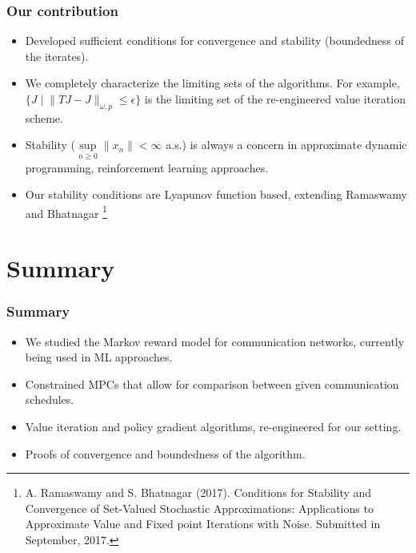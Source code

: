 \documentclass{beamer}
\begin{document}
\begin{frame}
 \frametitle{Our contribution}
 \begin{itemize}
\item Developed sufficient conditions for convergence and stability (boundedness of the iterates). 
  \item We completely characterize the limiting sets of the algorithms. For example,
  {\color{purple}$\{J \mid \lVert TJ - J \rVert_{\omega, p} \le \epsilon \}$} is the limiting set of the
  re-engineered value iteration scheme.
\item Stability ($\sup \limits_{n \ge 0} \lVert x_n \rVert < \infty$ a.s.) is always a concern in approximate dynamic programming, reinforcement learning approaches.
  \item Our stability conditions are Lyapunov function based, extending Ramaswamy and Bhatnagar
  \footnote{{\color{purple} \footnotesize A. Ramaswamy and S. Bhatnagar (2017).
 Conditions for Stability and Convergence of
Set-Valued Stochastic Approximations: Applications to Approximate Value and Fixed
point Iterations with Noise. Submitted in September, 2017.}}
 \end{itemize}
\end{frame}
\section{Summary}
\begin{frame}
 \frametitle{Summary}
 \begin{itemize}
 \item We studied the Markov reward model for communication networks, currently being used in ML
 approaches.
 \item Constrained MPCs that allow for comparison between given communication schedules.
 \item Value iteration and policy gradient algorithms, re-engineered for our setting.
 \item Proofs of convergence and boundedness of the algorithm.
 \end{itemize}
\end{frame}
\end{document}
